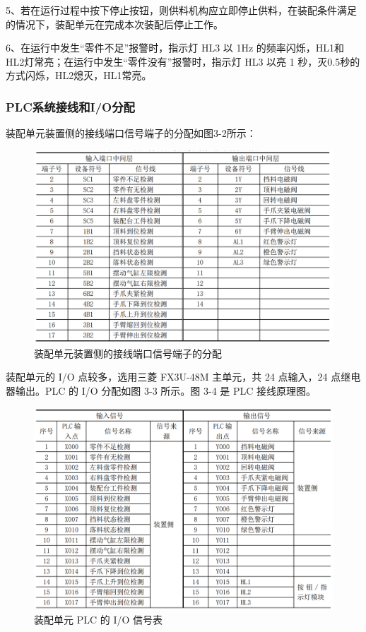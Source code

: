 \documentclass[12pt]{article}
\begin{document}
5、若在运行过程中按下停止按钮，则供料机构应立即停止供料，在装配条件满足的情况下，装配单元在完成本次装配后停止工作。

6、在运行中发生“零件不足”报警时，指示灯 HL3 以 1Hz 的频率闪烁，HL1和HL2灯常亮；在运行中发生“零件没有”报警时，指示灯 HL3 以亮 1 秒，灭0.5秒的方式闪烁，HL2熄灭，HL1常亮。 

\subsubsection{PLC系统接线和I/O分配}
装配单元装置侧的接线端口信号端子的分配如图3-2所示：

\begin{figure}[htbp]
    \centering
    \includegraphics[scale=0.8]{fig/信号端子.png}
    \caption{装配单元装置侧的接线端口信号端子的分配}
\end{figure} 

装配单元的 I/O 点较多，选用三菱 FX3U-48M 主单元，共 24 点输入，24 点继电器输出。PLC 的 I/O 分配如图 3-3 所示。图 3-4 是 PLC 接线原理图。

\begin{figure}[htbp]
    \centering
    \includegraphics[scale=0.8]{fig/PLCIO.png}
    \caption{装配单元 PLC 的 I/O 信号表}
\end{figure} 
\end{document}

